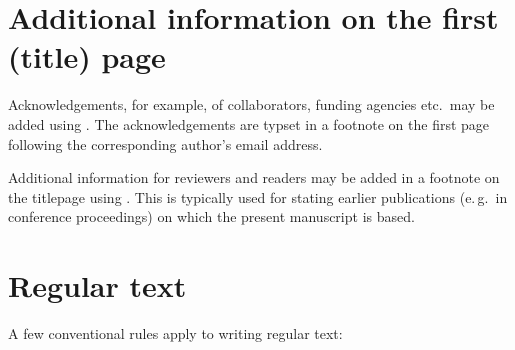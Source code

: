\documentclass[a4paper]{ltxdoc}
\begin{document}
\section{Additional information on the first (title) page}
\DescribeMacro{\acknowledgments}%
Acknowledgements, for example, of collaborators, funding agencies etc.\ may be added using . The acknowledgements are typset in a footnote on the first page following the corresponding author’s email address.

\DescribeMacro{\authornote}%
Additional information for reviewers and readers may be added in a footnote on the titlepage using . This is typically used for stating earlier publications (e.\,g.\ in conference proceedings) on which the present manuscript is based.



\section{Regular text}
A few conventional rules apply to writing regular text:
\end{document}
